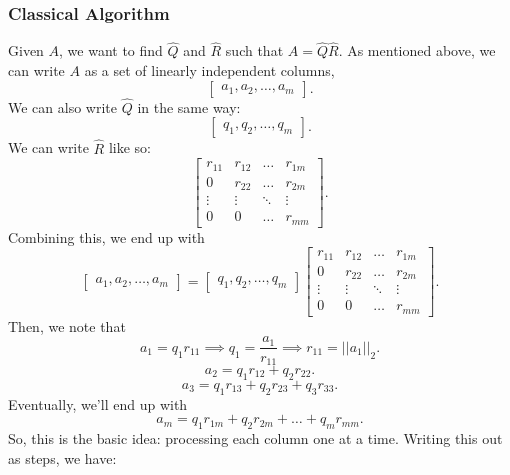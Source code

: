 \documentclass[letterpaper]{article}
\newcommand{\0}{\mathbf{0}}
\begin{document}
\subsubsection{Classical Algorithm}
Given $A$, we want to find $\hat{Q}$ and $\hat{R}$ such that $A = \hat{Q}\hat{R}$. As mentioned above, we can write $A$ as a set of linearly independent columns, 
\[\begin{bmatrix}
    a_1, a_2, \hdots, a_m
\end{bmatrix}.\]
We can also write $\hat{Q}$ in the same way:
\[\begin{bmatrix}
    q_1, q_2, \hdots, q_m
\end{bmatrix}.\]
We can write $\hat{R}$ like so: 
\[\begin{bmatrix}
    r_{11} & r_{12} & \hdots & r_{1m} \\ 
    0 & r_{22} & \hdots & r_{2m} \\ 
    \vdots & \vdots & \ddots & \vdots \\ 
    0 & 0 & \hdots & r_{mm}
\end{bmatrix}.\]
Combining this, we end up with 
\[\begin{bmatrix}
    a_1, a_2, \hdots, a_m
\end{bmatrix} = \begin{bmatrix}
    q_1, q_2, \hdots, q_m
\end{bmatrix} \begin{bmatrix}
    r_{11} & r_{12} & \hdots & r_{1m} \\ 
    0 & r_{22} & \hdots & r_{2m} \\ 
    \vdots & \vdots & \ddots & \vdots \\ 
    0 & 0 & \hdots & r_{mm}
\end{bmatrix}.\]
Then, we note that 
\[a_1 = q_1 r_{11} \implies q_1 = \frac{a_1}{r_{11}} \implies r_{11} = ||a_1||_2.\]
\[a_2 = q_1 r_{12} + q_2 r_{22}.\]
\[a_3 = q_1 r_{13} + q_2 r_{23} + q_3 r_{33}.\]
Eventually, we'll end up with 
\[a_m = q_1 r_{1m} + q_2 r_{2m} + \hdots + q_m r_{mm}.\]
So, this is the basic idea: processing each column one at a time. Writing this out as steps, we have: 
\end{document}
